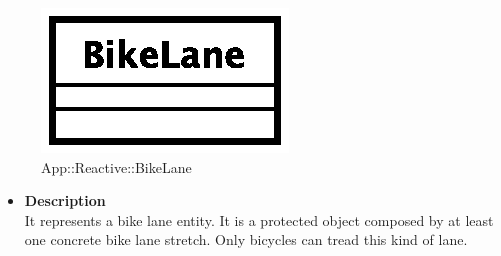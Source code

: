 \begin{figure}[h]
\centering
\includegraphics[scale=0.6,keepaspectratio]{images/solution/bike_lane.eps}
\caption{App::Reactive::BikeLane}
\label{fig:sd-app-bike_lane}
\end{figure}
\FloatBarrier
\begin{itemize}
  \item \textbf{Description} \\
    It represents a bike lane entity. It is a protected object composed by at least
one concrete bike lane stretch. Only bicycles can tread this kind of lane. 
\end{itemize}
